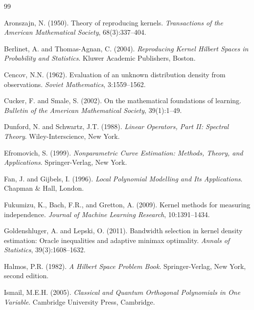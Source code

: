 \documentclass[11pt,a4paper]{article}
\begin{document}
\begin{thebibliography}{99}

Aronszajn, N. (1950).
\newblock Theory of reproducing kernels.
\newblock \emph{Transactions of the American Mathematical Society}, 68(3):337--404.

Berlinet, A. and Thomas-Agnan, C. (2004).
\newblock \emph{Reproducing Kernel Hilbert Spaces in Probability and Statistics}.
\newblock Kluwer Academic Publishers, Boston.

Cencov, N.N. (1962).
\newblock Evaluation of an unknown distribution density from observations.
\newblock \emph{Soviet Mathematics}, 3:1559--1562.

Cucker, F. and Smale, S. (2002).
\newblock On the mathematical foundations of learning.
\newblock \emph{Bulletin of the American Mathematical Society}, 39(1):1--49.

Dunford, N. and Schwartz, J.T. (1988).
\newblock \emph{Linear Operators, Part II: Spectral Theory}.
\newblock Wiley-Interscience, New York.

Efromovich, S. (1999).
\newblock \emph{Nonparametric Curve Estimation: Methods, Theory, and Applications}.
\newblock Springer-Verlag, New York.

Fan, J. and Gijbels, I. (1996).
\newblock \emph{Local Polynomial Modelling and Its Applications}.
\newblock Chapman \& Hall, London.

Fukumizu, K., Bach, F.R., and Gretton, A. (2009).
\newblock Kernel methods for measuring independence.
\newblock \emph{Journal of Machine Learning Research}, 10:1391--1434.

Goldenshluger, A. and Lepski, O. (2011).
\newblock Bandwidth selection in kernel density estimation: Oracle inequalities and adaptive minimax optimality.
\newblock \emph{Annals of Statistics}, 39(3):1608--1632.

Halmos, P.R. (1982).
\newblock \emph{A Hilbert Space Problem Book}.
\newblock Springer-Verlag, New York, second edition.

Ismail, M.E.H. (2005).
\newblock \emph{Classical and Quantum Orthogonal Polynomials in One Variable}.
\newblock Cambridge University Press, Cambridge.


\end{thebibliography}
\end{document}
